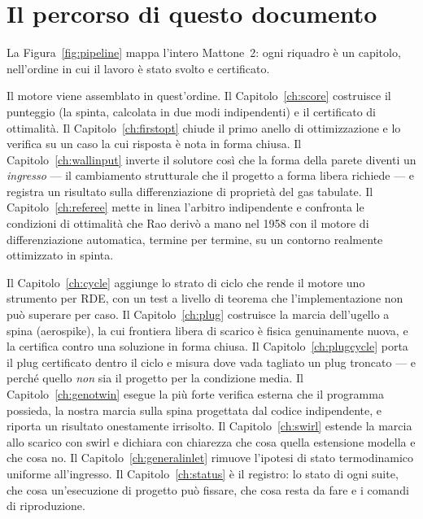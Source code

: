 \section{Il percorso di questo documento}

La Figura~\ref{fig:pipeline} mappa l'intero Mattone~2: ogni riquadro
è un capitolo, nell'ordine in cui il lavoro è stato svolto e
certificato.

Il motore viene assemblato in quest'ordine. Il
Capitolo~\ref{ch:score} costruisce il punteggio (la spinta,
calcolata in due modi indipendenti) e il certificato di ottimalità.
Il Capitolo~\ref{ch:firstopt} chiude il primo anello di
ottimizzazione e lo verifica su un caso la cui risposta è nota in
forma chiusa. Il Capitolo~\ref{ch:wallinput} inverte il solutore
così che la forma della parete diventi un \emph{ingresso} --- il
cambiamento strutturale che il progetto a forma libera richiede ---
e registra un risultato sulla differenziazione di proprietà del gas
tabulate. Il Capitolo~\ref{ch:referee} mette in linea l'arbitro
indipendente e confronta le condizioni di ottimalità che Rao derivò
a mano nel 1958 con il motore di differenziazione automatica,
termine per termine, su un contorno realmente ottimizzato in spinta.

Il Capitolo~\ref{ch:cycle} aggiunge lo strato di ciclo che rende il
motore uno strumento per RDE, con un test a livello di teorema che
l'implementazione non può superare per caso. Il
Capitolo~\ref{ch:plug} costruisce la marcia dell'ugello a spina
(aerospike), la cui frontiera libera di scarico è fisica
genuinamente nuova, e la certifica contro una soluzione in forma
chiusa. Il Capitolo~\ref{ch:plugcycle} porta il plug certificato
dentro il ciclo e misura dove vada tagliato un plug troncato --- e
perché quello \emph{non} sia il progetto per la condizione media. Il
Capitolo~\ref{ch:genotwin} esegue la più forte verifica esterna che
il programma possieda, la nostra marcia sulla spina progettata dal
codice indipendente, e riporta un risultato onestamente irrisolto.
Il Capitolo~\ref{ch:swirl} estende la marcia allo scarico con swirl
e dichiara con chiarezza che cosa quella estensione modella e che
cosa no. Il Capitolo~\ref{ch:generalinlet} rimuove l'ipotesi di
stato termodinamico uniforme all'ingresso. Il
Capitolo~\ref{ch:status} è il registro: lo stato di ogni suite, che
cosa un'esecuzione di progetto può fissare, che cosa resta da fare e
i comandi di riproduzione.


